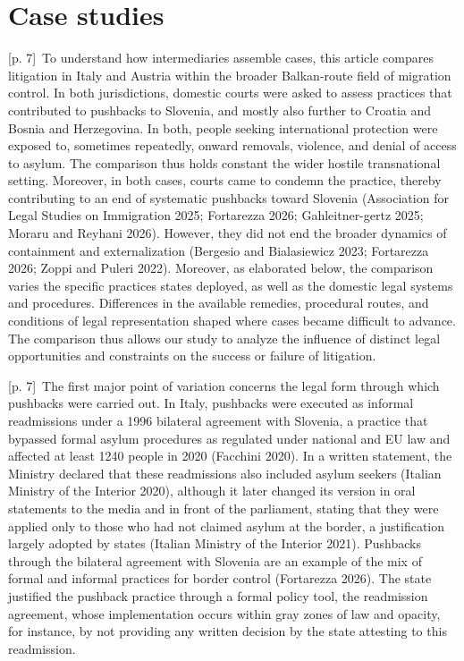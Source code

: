 \documentclass[10pt,a4paper]{article}
\begin{document}
\section*{Case studies}
{\scriptsize\color{gray} [p. 7]}\ To understand how intermediaries assemble cases, this article compares litigation in Italy and Austria within the broader Balkan-route field of migration control. In both jurisdictions, domestic courts were asked to assess practices that contributed to pushbacks to Slovenia, and mostly also further to Croatia and Bosnia and Herzegovina. In both, people seeking international protection were exposed to, sometimes repeatedly, onward removals, violence, and denial of access to asylum. The comparison thus holds constant the wider hostile transnational setting. Moreover, in both cases, courts came to condemn the practice, thereby contributing to an end of systematic pushbacks toward Slovenia (Association for Legal Studies on Immigration 2025; Fortarezza 2026; Gahleitner-gertz 2025; Moraru and Reyhani 2026). However, they did not end the broader dynamics of containment and externalization (Bergesio and Bialasiewicz 2023; Fortarezza 2026; Zoppi and Puleri 2022). Moreover, as elaborated below, the comparison varies the specific practices states deployed, as well as the domestic legal systems and procedures. Differences in the available remedies, procedural routes, and conditions of legal representation shaped where cases became difficult to advance. The comparison thus allows our study to analyze the influence of distinct legal opportunities and constraints on the success or failure of litigation.\par
{\scriptsize\color{gray} [p. 7]}\ The first major point of variation concerns the legal form through which pushbacks were carried out. In Italy, pushbacks were executed as informal readmissions under a 1996 bilateral agreement with Slovenia, a practice that bypassed formal asylum procedures as regulated under national and EU law and affected at least 1240 people in 2020 (Facchini 2020). In a written statement, the Ministry declared that these readmissions also included asylum seekers (Italian Ministry of the Interior 2020), although it later changed its version in oral statements to the media and in front of the parliament, stating that they were applied only to those who had not claimed asylum at the border, a justification largely adopted by states (Italian Ministry of the Interior 2021). Pushbacks through the bilateral agreement with Slovenia are an example of the mix of formal and informal practices for border control (Fortarezza 2026). The state justified the pushback practice through a formal policy tool, the readmission agreement, whose implementation occurs within gray zones of law and opacity, for instance, by not providing any written decision by the state attesting to this readmission.\par
\end{document}
